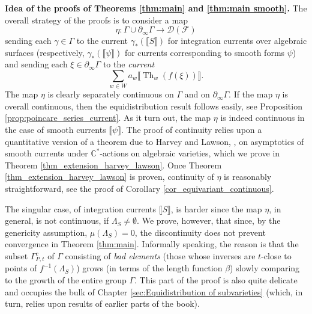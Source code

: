 \documentclass[12pt]{amsbook}%
\theoremstyle{definition}
\theoremstyle{remark}
\numberwithin{section}{chapter}
\numberwithin{subsection}{section}
\numberwithin{figure}{chapter}
\DeclareMathOperator{\Th}{Th}
\def\cD{{\mathscr{D}}}
\def\cF{{\mathscr{F}}}
\def\Ga{\Gamma}
\def\ga{\gamma}
\def\La{\Lambda}
\def\geo{\partial_\infty}
\def\kap{}
\begin{document}
\medskip
{\bf Idea of the proofs of Theorems \ref{thm:main} and \ref{thm:main smooth}.} The overall strategy of the proofs is to consider a 
map
\begin{equation}\label{eq:eta-map}
\eta: \Ga\cup \geo \Ga\to \cD(\cF)
\end{equation}
sending each $\ga\in \Ga$ to the current $\ga_*(\llbracket S\rrbracket)$ for integration currents over algebraic surfaces 
(respectively, $\ga_*(\llbracket \psi \rrbracket)$ for currents corresponding to smooth forms $\psi$) and sending each $\xi\in \geo \Ga$ to the {\em  current}
$$
 \sum_{w\in W}  a_w \llbracket\Th_w(f(\xi))\rrbracket. 
$$
The map $\eta$ is clearly separately continuous on $\Ga$ and on $\geo \Ga$. If the map $\eta$ is overall continuous, then the equidistribution result follows easily, see Proposition \ref{prop:poincare_series_current}. As it turn out, the map $\eta$ is indeed continuous in the case of smooth currents $\llbracket \psi \rrbracket$. The proof of continuity relies upon a quantitative version of a theorem due to Harvey and Lawson, \cite{harvey_lawson_survey,harvey_lawson}, on asymptotics of smooth currents under 
$\mathbb C^*$-actions on algebraic varieties, which we prove in Theorem \ref{thm_extension_harvey_lawson}. Once Theorem \ref{thm_extension_harvey_lawson} is proven, continuity of 
$\eta$ is reasonably straightforward, see the proof of Corollary  \ref{cor_equivariant_continuous}. 

The singular case, of integration currents $\llbracket S\rrbracket$, is harder since the map $\eta$, in general, is not continuous, if $\La_S\ne \emptyset$. 
We prove, however, that since, by the genericity assumption, $\mu(\La_S)=0$, the discontinuity does not prevent convergence in Theorem \ref{thm:main}. Informally speaking, the reason is that the subset $\Ga^c_{P,t}$ of $\Ga$ consisting of {\em bad elements} (those whose inverses are $t$-close to points of $f^{-1}(\La_S)$)  grows (in terms of the length function $\beta$) slowly comparing to the growth of the entire group $\Ga$. This part of the proof is also quite delicate and occupies the bulk of Chapter \ref{sec:Equidistribution of subvarieties} (which, in turn, relies upon results of earlier parts of the book). 
\end{document}
